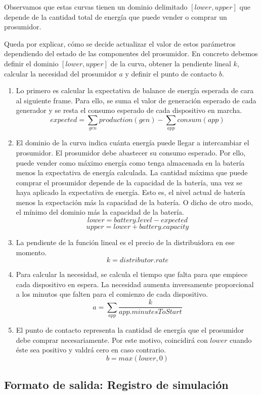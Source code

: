 \documentclass[12pt,a4paper,openright,oneside]{article}
\numberwithin{equation}{section}
\theoremstyle{definition}
\begin{document}
Observamos que estas curvas tienen un dominio delimitado $[lower,upper]$ que depende de la cantidad total de energía que puede vender o comprar un prosumidor.

Queda por explicar, cómo se decide actualizar el valor de estos parámetros dependiendo del estado de las componentes del prosumidor. En concreto debemos definir el dominio $[lower,upper]$ de la curva, obtener la pendiente lineal $k$, calcular la necesidad del prosumidor $a$ y definir el punto de contacto $b$.

\begin{enumerate}
        \item Lo primero es calcular la expectativa de balance de energía esperada de cara al siguiente frame. Para ello, se suma el valor de generación esperado de cada generador y se resta el consumo esperado de cada dispositivo en marcha.
        $$ expected = \sum_{gen} production(gen) - \sum_{app} consum(app)$$
        \item El dominio de la curva indica cuánta energía puede llegar a intercambiar el prosumidor. El prosumidor debe abastecer su consumo esperado. Por ello, puede vender como máximo energía como tenga almacenada en la batería menos la expectativa de energía calculada. La cantidad máxima que puede comprar el prosumidor depende de la capacidad de la batería, una vez se haya aplicado la expectativa de energía. Esto es, el nivel actual de batería menos la expectación más la capacidad de la batería. O dicho de otro modo, el mínimo del dominio más la capacidad de la batería.
        $$ lower = battery.level - expected $$
        $$ upper = lower + battery.capacity $$
        \item La pendiente de la función lineal es el precio de la distribuidora en ese momento.
        $$ k = distributor.rate $$
        \item Para calcular la necesidad, se calcula el tiempo que falta para que empiece cada dispositivo en espera. La necesidad aumenta inversamente proporcional a los minutos que falten para el comienzo de cada dispositivo.
        $$ a = \sum_{app} \frac{k}{app.minutesToStart} $$
        \item El punto de contacto representa la cantidad de energía que el prosumidor debe comprar necesariamente. Por este motivo, coincidirá con $lower$ cuando éste sea positivo y valdrá cero en caso contrario.
        $$ b = max( lower, 0 ) $$
\end{enumerate}
\clearpage
\subsection{Formato de salida: Registro de simulación}
\end{document}
